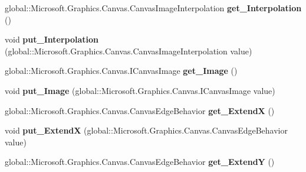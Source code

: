 \begin{DoxyCompactItemize}
global\+::\+Microsoft.\+Graphics.\+Canvas.\+Canvas\+Image\+Interpolation {\bfseries get\+\_\+\+Interpolation} ()
\item 
\mbox{\label{interface_microsoft_1_1_graphics_1_1_canvas_1_1_brushes_1_1_i_canvas_image_brush_a149e4d24e65f75b3f58f3a71d893bcd4}} 
void {\bfseries put\+\_\+\+Interpolation} (global\+::\+Microsoft.\+Graphics.\+Canvas.\+Canvas\+Image\+Interpolation value)
\item 
\mbox{\label{interface_microsoft_1_1_graphics_1_1_canvas_1_1_brushes_1_1_i_canvas_image_brush_a0a2e397b21701c2009442817061aea19}} 
global\+::\+Microsoft.\+Graphics.\+Canvas.\+I\+Canvas\+Image {\bfseries get\+\_\+\+Image} ()
\item 
\mbox{\label{interface_microsoft_1_1_graphics_1_1_canvas_1_1_brushes_1_1_i_canvas_image_brush_adce6e5d6d2750a7392b5352faf3f5f4d}} 
void {\bfseries put\+\_\+\+Image} (global\+::\+Microsoft.\+Graphics.\+Canvas.\+I\+Canvas\+Image value)
\item 
\mbox{\label{interface_microsoft_1_1_graphics_1_1_canvas_1_1_brushes_1_1_i_canvas_image_brush_aa972b7d23b8fc1eb398d518a07940b35}} 
global\+::\+Microsoft.\+Graphics.\+Canvas.\+Canvas\+Edge\+Behavior {\bfseries get\+\_\+\+ExtendX} ()
\item 
\mbox{\label{interface_microsoft_1_1_graphics_1_1_canvas_1_1_brushes_1_1_i_canvas_image_brush_a5355b52f83105ebc903d8a09622319eb}} 
void {\bfseries put\+\_\+\+ExtendX} (global\+::\+Microsoft.\+Graphics.\+Canvas.\+Canvas\+Edge\+Behavior value)
\item 
\mbox{\label{interface_microsoft_1_1_graphics_1_1_canvas_1_1_brushes_1_1_i_canvas_image_brush_aa40db9376b341ac0233a6f2984cff951}} 
global\+::\+Microsoft.\+Graphics.\+Canvas.\+Canvas\+Edge\+Behavior {\bfseries get\+\_\+\+ExtendY} ()
\item 

\end{DoxyCompactItemize}
